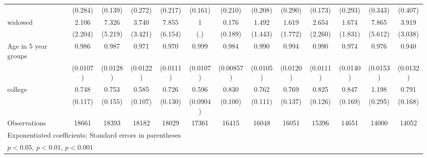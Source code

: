 {\begin{tabular}{l*{12}{c}}
                    &     (0.284)         &     (0.139)         &     (0.272)         &     (0.217)         &     (0.161)         &     (0.210)         &     (0.208)         &     (0.290)         &     (0.173)         &     (0.293)         &     (0.343)         &     (0.407)         \\
[1em]
widowed             &       2.106         &       7.326\sym{**} &       3.740         &       7.855\sym{**} &           1         &       0.176         &       1.492         &       1.619         &       2.654         &       1.674         &       7.865\sym{**} &       3.919         \\
                    &     (2.204)         &     (5.219)         &     (3.421)         &     (6.154)         &         (.)         &     (0.189)         &     (1.443)         &     (1.772)         &     (2.260)         &     (1.831)         &     (5.612)         &     (3.038)         \\
[1em]
Age in 5 year groups&       0.986         &       0.987         &       0.971\sym{*}  &       0.970\sym{**} &       0.999         &       0.984         &       0.990         &       0.994         &       0.990         &       0.974         &       0.976         &       0.940\sym{***}\\
                    &    (0.0107)         &    (0.0128)         &    (0.0122)         &    (0.0111)         &    (0.0107)         &   (0.00857)         &    (0.0105)         &    (0.0120)         &    (0.0111)         &    (0.0140)         &    (0.0153)         &    (0.0132)         \\
[1em]
college             &       0.748         &       0.753         &       0.585\sym{**} &       0.726         &       0.596\sym{***}&       0.830         &       0.762         &       0.769         &       0.825         &       0.847         &       1.198         &       0.791         \\
                    &     (0.117)         &     (0.155)         &     (0.107)         &     (0.130)         &    (0.0904)         &     (0.100)         &     (0.111)         &     (0.137)         &     (0.126)         &     (0.169)         &     (0.295)         &     (0.168)         \\
\hline
Observations        &       18661         &       18393         &       18182         &       18029         &       17361         &       16415         &       16048         &       16051         &       15396         &       14651         &       14000         &       14052         \\
\hline\hline
\multicolumn{13}{l}{\footnotesize Exponentiated coefficients; Standard errors in parentheses}\\
\multicolumn{13}{l}{\footnotesize \sym{*} \(p<0.05\), \sym{**} \(p<0.01\), \sym{***} \(p<0.001\)}\\
\end{tabular}
}

